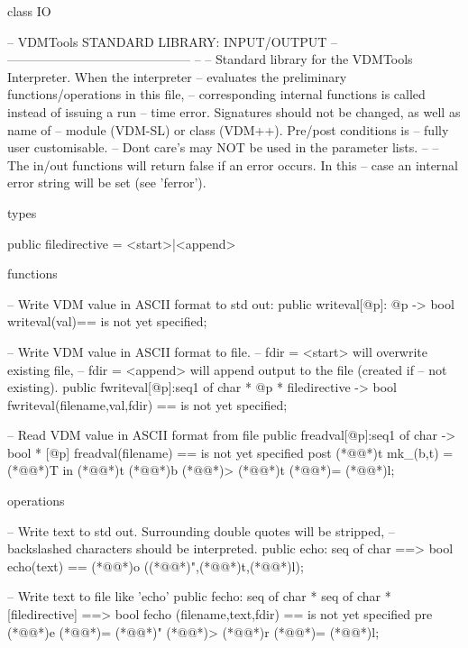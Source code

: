 \documentclass[a4paper]{article}
\begin{document}
\title{}
\author{}
\begin{vdm_al}
class IO

--  VDMTools STANDARD LIBRARY: INPUT/OUTPUT
--      --------------------------------------------
-- 
-- Standard library for the VDMTools Interpreter. When the interpreter
-- evaluates the preliminary functions/operations in this file,
-- corresponding internal functions is called instead of issuing a run
-- time error. Signatures should not be changed, as well as name of
-- module (VDM-SL) or class (VDM++). Pre/post conditions is 
-- fully user customisable. 
-- Dont care's may NOT be used in the parameter lists.
--
-- The in/out functions  will return false if an error occurs. In this
-- case an internal error string will be set (see 'ferror').

types

public
filedirective = <start>|<append> 

functions

-- Write VDM value in ASCII format to std out:
public
writeval[@p]: @p -> bool
writeval(val)==
  is not yet specified;

-- Write VDM value in ASCII format to file.
-- fdir = <start> will overwrite existing file,
-- fdir = <append> will append output to the file (created if
-- not existing).
public
fwriteval[@p]:seq1 of char * @p * filedirective -> bool
fwriteval(filename,val,fdir) ==
  is not yet specified;

-- Read VDM value in ASCII format from file
public
freadval[@p]:seq1 of char -> bool * [@p]
freadval(filename) ==
  is not yet specified
  post (*@@*)t mk_(b,t) = (*@@*)T in (*@@*)t (*@\vdmnotcovered{}@*)b (*@\vdmnotcovered{=}@*)> (*@\vdmnotcovered{}@*)t (*@\vdmnotcovered{}@*)= (*@@*)l;

operations

-- Write text to std out. Surrounding double quotes will be stripped,
-- backslashed characters should be interpreted.
public
echo: seq of char ==> bool
echo(text) ==
  (*@@*)o ((*@@*)",(*@@*)t,(*@@*)l);

-- Write text to file like 'echo'
public
fecho: seq of char * seq of char * [filedirective] ==> bool
fecho (filename,text,fdir) ==
  is not yet specified
  pre (*@@*)e (*@\vdmnotcovered{}@*)= (*@@*)" (*@\vdmnotcovered{<=}@*)> (*@@*)r (*@\vdmnotcovered{}@*)= (*@@*)l;


\end{vdm_al}
\end{document}
